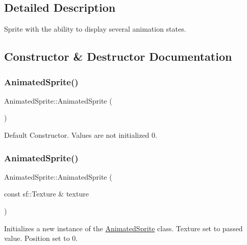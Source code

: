 \subsection{Detailed Description}
Sprite with the ability to display several animation states. 



\subsection{Constructor \& Destructor Documentation}
\mbox{\label{class_animated_sprite_a1147eb833593fa4c28854b96a84413a9}} 
\subsubsection{\texorpdfstring{Animated\+Sprite()}{AnimatedSprite()}\hspace{0.1cm}{\footnotesize\ttfamily [1/3]}}
{\footnotesize\ttfamily Animated\+Sprite\+::\+Animated\+Sprite (\begin{DoxyParamCaption}{ }\end{DoxyParamCaption})}



Default Constructor. Values are not initialized 0.

\mbox{\label{class_animated_sprite_af8e492c2897e3335ba96149085f4d165}} 
\subsubsection{\texorpdfstring{Animated\+Sprite()}{AnimatedSprite()}\hspace{0.1cm}{\footnotesize\ttfamily [2/3]}}
{\footnotesize\ttfamily Animated\+Sprite\+::\+Animated\+Sprite (\begin{DoxyParamCaption}\item[{const sf\+::\+Texture \&}]{texture }\end{DoxyParamCaption})\hspace{0.3cm}{\ttfamily [explicit]}}



Initializes a new instance of the \hyperlink{class_animated_sprite}{Animated\+Sprite} class. Texture set to passed value. Position set to 0. 


